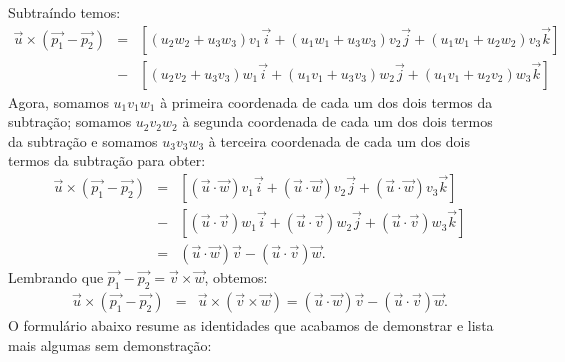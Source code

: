 Subtraíndo temos:
\begin{eqnarray*}
\vec{u}\times\left(\vec{p_1}-\vec{p_2}\right)&=&    \left[\left(u_2w_2+u_3w_3\right)v_1\vec{i}+\left(u_1w_1+u_3w_3\right)v_2\vec{j}+\left(u_1w_1+u_2w_2\right)v_3\vec{k}\right]\\
&-&
\left[\left(u_2v_2+u_3v_3\right)w_1\vec{i}+\left(u_1v_1+u_3v_3\right)w_2\vec{j}+\left(u_1v_1+u_2v_2\right)w_3\vec{k}\right]
\end{eqnarray*}
Agora, somamos $u_1v_1w_1$ à primeira coordenada de cada um dos dois termos da subtração; somamos $u_2v_2w_2$  à segunda coordenada de cada um dos dois termos da subtração e somamos $u_3v_3w_3$ à terceira coordenada de cada um dos dois termos da subtração para obter:
 \begin{eqnarray*}
 \vec{u}\times\left(\vec{p_1}-\vec{p_2}\right)&=&    \left[\left(\vec{u}\cdot\vec{w}\right)v_1\vec{i}+\left(\vec{u}\cdot\vec{w}\right)v_2\vec{j}+\left(\vec{u}\cdot\vec{w}\right)v_3\vec{k}\right]\\
 &-&
 \left[\left(\vec{u}\cdot\vec{v}\right)w_1\vec{i}+\left(\vec{u}\cdot\vec{v}\right)w_2\vec{j}+\left(\vec{u}\cdot\vec{v}\right)w_3\vec{k}\right]\\
 &=&(\vec{u}\cdot\vec{w})\vec{v}-(\vec{u}\cdot\vec{v})\vec{w}.
 \end{eqnarray*}
Lembrando que $\vec{p_1}-\vec{p_2}=\vec{v}\times\vec{w}$, obtemos:
\begin{eqnarray*}
\vec{u}\times\left(\vec{p_1}-\vec{p_2}\right)&=&
\vec{u}\times\left(\vec{v}\times\vec{w}\right)=(\vec{u}\cdot\vec{w})\vec{v}-(\vec{u}\cdot\vec{v})\vec{w}.
\end{eqnarray*}
O formulário abaixo resume as identidades que acabamos de demonstrar e lista mais algumas sem demonstração:

